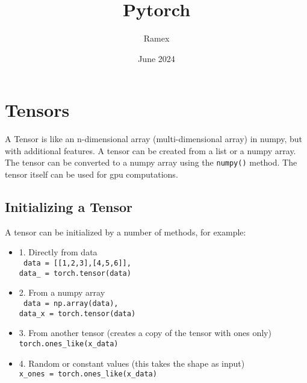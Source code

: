 \documentclass{article}
\title{Pytorch}
\author{Ramex}
\date{June 2024}
\begin{document}

\maketitle

\section{Tensors}

A Tensor is like an n-dimensional array (multi-dimensional array) 
in numpy, but with additional features. 
A tensor can be created from a list or a numpy array.
The tensor can be converted to a numpy array using the \texttt{numpy()} 
method. The tensor itself can be used for gpu computations.

\subsection{Initializing a Tensor}

A tensor can be initialized by a number of methods, for example:

\begin{itemize}
    \item 1. Directly from data \\
    \texttt{
        data = [[1,2,3],[4,5,6]], \\
        data\_ = torch.tensor(data)
    }
    \item 2. From a numpy array \\
    \texttt{
        data = np.array(data), \\
        data\_x = torch.tensor(data)
    }
    \item 3. From another tensor (creates a copy of the tensor with ones only) \\
    \texttt{torch.ones\_like(x\_data)}
    \item 4. Random or constant values (this takes the shape as input) \\
    \texttt{x\_ones = torch.ones\_like(x\_data)}
\end{itemize}
\end{document}
